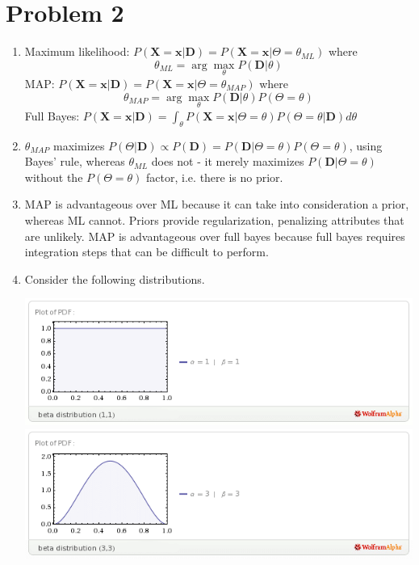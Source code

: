 \documentclass{article}
\begin{document}
\section*{Problem 2}
\begin{enumerate}
\item Maximum likelihood: $P(\mathbf X=\mathbf x | \mathbf D)=P(\mathbf X = \mathbf x | \Theta=\theta_{ML})$
  where $$\theta_{ML} = \arg \max_\theta P(\mathbf D|\theta)$$
  MAP: $P(\mathbf X = \mathbf x | \mathbf D) = P(\mathbf X = \mathbf x | \Theta = \theta_{MAP})$
  where $$\theta_{MAP} = \arg \max_\theta P(\mathbf D | \theta)P(\Theta = \theta)$$
  Full Bayes: $P(\mathbf X = \mathbf x | \mathbf D) = \int_\theta P(\mathbf X = \mathbf x | \Theta = \theta)P(\Theta = \theta | \mathbf D)d\theta$

\item $\theta_{MAP}$ maximizes $P(\Theta|\mathbf D)\propto P(\mathbf D)=P(\mathbf D | \Theta = \theta)P(\Theta = \theta)$,
  using Bayes' rule, whereas $\theta_{ML}$ does not - it merely maximizes $P(\mathbf D | \Theta = \theta)$
  without the $P(\Theta=\theta)$ factor, i.e. there is no prior.  
\item MAP is advantageous over ML because it can take into consideration
  a prior, whereas ML cannot. Priors provide regularization, penalizing
  attributes that are unlikely. 
  MAP is advantageous over full bayes because full bayes requires
  integration steps that can be difficult to perform. 
\item
  Consider the following distributions.
      \begin{center}
        \includegraphics[scale=.5]{beta_1_1.png}
        \includegraphics[scale=.5]{beta_3_3.png}

\end{center}
\end{enumerate}
\end{document}
